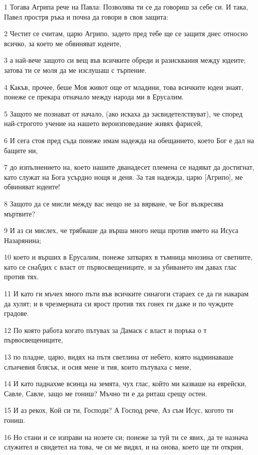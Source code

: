 \par 1 Тогава Агрипа рече на Павла: Позволява ти се да говориш за себе си. И така, Павел простря ръка и почна да говори в своя защита:
\par 2 Честит се считам, царю Агрипо, задето пред тебе ще се защитя днес относно всичко, за което ме обвиняват юдеите,
\par 3 а най-вече защото си вещ във всичките обреди и разисквания между юдеите; затова ти се моля да ме изслушаш с търпение.
\par 4 Какъв, прочее, беше Моя живот още от младини, това всичките юдеи знаят, понеже се прекара отначало между народа ми в Ерусалим.
\par 5 Защото ме познават от начало, (ако искаха да засвидетелствуват), че според най-строгото учение на нашето вероизповедание живях фарисей,
\par 6 И сега стоя пред съда понеже имам надежда на обещанието, което Бог е дал на бащите ни,
\par 7 до изпълнението на, което нашите дванадесет племена се надяват да достигнат, като служат на Бога усърдно нощя и деня. 3а тая надежда, царю [Агрипо], ме обвиняват юдеите!
\par 8 Защото да се мисли между вас нещо не за вярване, че Бог възкресява мъртвите?
\par 9 И аз си мислех, че трябваше да върша много неща против името на Исуса Назарянина;
\par 10 което и върших в Ерусалим, понеже затварях в тъмница мнозина от светиите, като се снабдих с власт от първосвещениците, и за убиването им давах глас против тях.
\par 11 И като ги мъчех много пъти във всичките синагоги стараех се да ги накарам да хулят; и в чрезмерната си ярост против тях гонех ги даже и по чуждите градове.
\par 12 По която работа когато пътувах за Дамаск с власт и поръка о т първосвещениците,
\par 13 по пладне, царю, видях на пътя светлина от небето, която надминаваше слънчевия блясък, и осия мене и тия, които пътуваха с мене,
\par 14 И като паднахме всинца на земята, чух глас, който ми казваше на еврейски, Савле, Савле, защо ме гониш? Мъчно ти е да риташ срещу остен.
\par 15 И аз рекох, Кой си ти, Господи? А Господ рече, Аз съм Исус, когото ти гониш.
\par 16 Но стани и се изправи на нозете си; понеже за туй ти се явих, да те назнача служител и свидетел на това, че си ме видял, и на онова, което ще ти открия,
